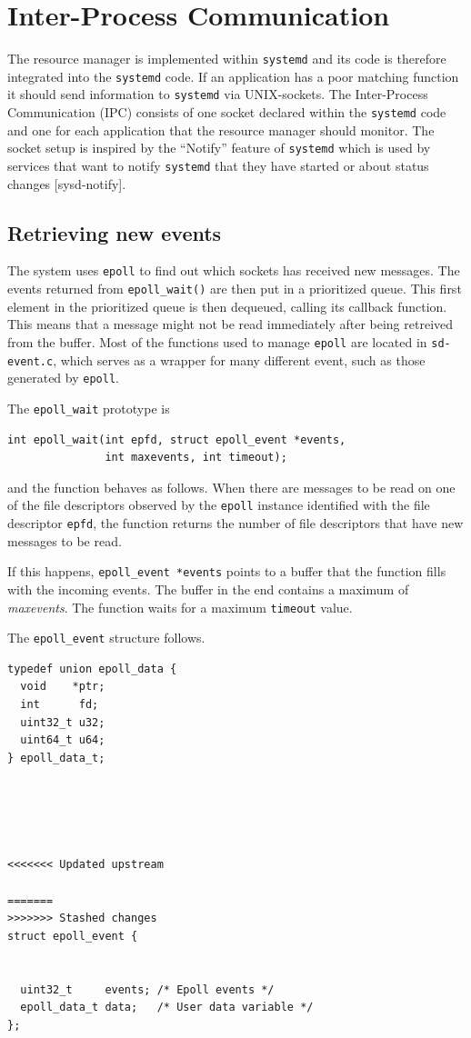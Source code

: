\documentclass[nobiblatex]{LTHthesis}
\begin{document}
\section{Inter-Process Communication}

The resource manager is implemented within \texttt{systemd} and its code
is therefore integrated into the \texttt{systemd} code. If an application
has a poor matching function it should send information to \texttt{systemd}
via UNIX-sockets. The Inter-Process Communication (IPC) consists of one 
socket declared within the \texttt{systemd} code and one for each application
that the resource manager should monitor. 
The socket setup is inspired by the ``Notify'' feature of \texttt{systemd}
which is used by services that want to notify \texttt{systemd} that they 
have started or about status changes [sysd-notify].

\subsection{Retrieving new events}

The system uses \texttt{epoll} to find out which sockets has received new 
messages. The events returned from \texttt{epoll\_wait()} are then put in 
a prioritized queue. This first element in the prioritized queue is then 
dequeued, calling its callback function. This means that a message might 
not be read immediately after being retreived from the buffer. Most of the
functions used to manage \texttt{epoll} are located in \texttt{sd-event.c},
which serves as a wrapper for many different event, such as those generated by 
\texttt{epoll}.

The \texttt{epoll\_wait} prototype is
\begin{verbatim}
int epoll_wait(int epfd, struct epoll_event *events,
               int maxevents, int timeout);	 
\end{verbatim}
and the function behaves as follows. When there are messages to be read on 
one of the file descriptors observed by the \texttt{epoll} instance 
identified with the file descriptor \texttt{epfd}, the function returns 
the number of file descriptors that have new messages to be read. 

If this happens, \texttt{epoll\_event *events} points to a buffer that 
the function fills with the incoming events. The buffer in the end contains
a maximum of \emph{maxevents}. The function waits for a maximum
\texttt{timeout} value.

The \texttt{epoll\_event} structure follows.
\begin{lstlisting}
typedef union epoll_data {
  void    *ptr;
  int      fd;
  uint32_t u32;
  uint64_t u64;
} epoll_data_t;





<<<<<<< Updated upstream

=======
>>>>>>> Stashed changes
struct epoll_event {


  uint32_t     events; /* Epoll events */
  epoll_data_t data;   /* User data variable */
};
\end{lstlisting}
\end{document}
